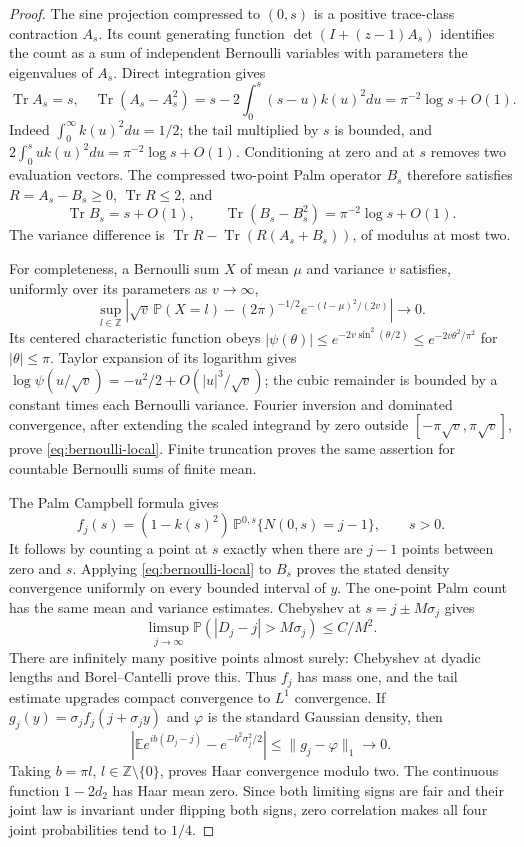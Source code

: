 \begin{proof}
The sine projection compressed to $(0,s)$ is a positive trace-class
contraction $A_s$. Its count generating function
$\det(I+(z-1)A_s)$ identifies the count as a sum of independent
Bernoulli variables with parameters the eigenvalues of $A_s$.
Direct integration gives
\[
 \operatorname{Tr}A_s=s,\quad
 \operatorname{Tr}(A_s-A_s^2)
 =s-2\int_0^s(s-u)k(u)^2du=\pi^{-2}\log s+O(1).
\]
Indeed $\int_0^\infty k(u)^2du=1/2$; the tail multiplied by $s$
is bounded, and $2\int_0^s uk(u)^2du=\pi^{-2}\log s+O(1)$.
Conditioning at zero and at $s$ removes two evaluation vectors.
The compressed two-point Palm operator $B_s$ therefore satisfies
$R=A_s-B_s\ge0$, $\operatorname{Tr}R\le2$, and
\[
 \operatorname{Tr}B_s=s+O(1),\qquad
 \operatorname{Tr}(B_s-B_s^2)=\pi^{-2}\log s+O(1).
\]
The variance difference is $\operatorname{Tr}R-
\operatorname{Tr}(R(A_s+B_s))$, of modulus at most two.

For completeness, a Bernoulli sum $X$ of mean $\mu$ and variance $v$
satisfies, uniformly over its parameters as $v\to\infty$,
\begin{equation}\label{eq:bernoulli-local}
 \sup_{l\in\mathbb Z}\left|\sqrt v\,\mathbb P(X=l)
  -(2\pi)^{-1/2}e^{-(l-\mu)^2/(2v)}\right|\longrightarrow0.
\end{equation}
Its centered characteristic function obeys
$|\psi(\theta)|\le e^{-2v\sin^2(\theta/2)}
\le e^{-2v\theta^2/\pi^2}$ for $|\theta|\le\pi$.
Taylor expansion of its logarithm gives
$\log\psi(u/\sqrt v)=-u^2/2+O(|u|^3/\sqrt v)$; the cubic
remainder is bounded by a constant times each Bernoulli variance.
Fourier inversion and dominated convergence, after extending the
scaled integrand by zero outside $[-\pi\sqrt v,\pi\sqrt v]$,
prove \eqref{eq:bernoulli-local}. Finite truncation proves the same
assertion for countable Bernoulli sums of finite mean.

The Palm Campbell formula gives
\[
 f_j(s)=(1-k(s)^2)\,
      \mathbb P^{0,s}\{N(0,s)=j-1\},\qquad s>0.
\]
It follows by counting a point at $s$ exactly when there are $j-1$
points between zero and $s$. Applying \eqref{eq:bernoulli-local} to
$B_s$ proves the stated density convergence uniformly on every
bounded interval of $y$. The one-point Palm count has the same
mean and variance estimates. Chebyshev at $s=j\pm M\sigma_j$
gives
\[
 \limsup_{j\to\infty}\mathbb P(|D_j-j|>M\sigma_j)\le C/M^2.
\]
There are infinitely many positive points almost surely: Chebyshev
at dyadic lengths and Borel--Cantelli prove this. Thus $f_j$ has
mass one, and the tail estimate upgrades compact convergence to
$L^1$ convergence. If $g_j(y)=\sigma_jf_j(j+\sigma_jy)$ and
$\varphi$ is the standard Gaussian density, then
\[
 \left|\mathbb Ee^{ib(D_j-j)}-e^{-b^2\sigma_j^2/2}\right|
 \le\|g_j-\varphi\|_1\longrightarrow0.
\]
Taking $b=\pi l$, $l\in\mathbb Z\setminus\{0\}$, proves Haar
convergence modulo two. The continuous function $1-2d_2$ has Haar
mean zero. Since both limiting signs are fair and their joint law
is invariant under flipping both signs, zero correlation makes
all four joint probabilities tend to $1/4$.
\end{proof}

